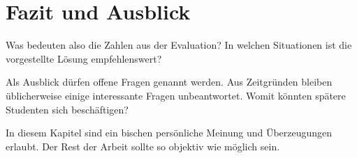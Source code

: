 \chapter{Fazit und Ausblick}\label{sec:conclusion}

Was bedeuten also die Zahlen aus der Evaluation?
In welchen Situationen ist die vorgestellte Lösung empfehlenswert?

Als Ausblick dürfen offene Fragen genannt werden.
Aus Zeitgründen bleiben üblicherweise einige interessante Fragen unbeantwortet.
Womit könnten spätere Studenten sich beschäftigen?

In diesem Kapitel sind ein bischen persönliche Meinung
und Überzeugungen erlaubt.
Der Rest der Arbeit sollte so objektiv wie möglich sein.
